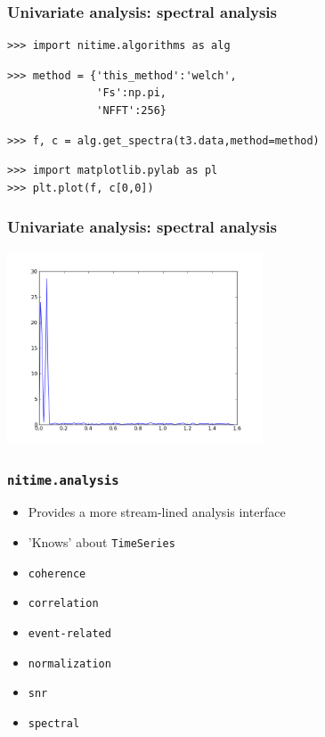 \documentclass{beamer}
\begin{document}
\begin{frame}[fragile]
\frametitle{Univariate analysis: spectral analysis }
\begin{lstlisting}
>>> import nitime.algorithms as alg
\end{lstlisting}
\pause
\begin{lstlisting}
>>> method = {'this_method':'welch',
              'Fs':np.pi,
              'NFFT':256}
\end{lstlisting}
\pause
\begin{lstlisting}
>>> f, c = alg.get_spectra(t3.data,method=method)
\end{lstlisting}
\pause
\begin{lstlisting}
>>> import matplotlib.pylab as pl 
>>> plt.plot(f, c[0,0])
\end{lstlisting}
\end{frame}

\begin{frame}
\frametitle{Univariate analysis: spectral analysis}
\includegraphics[height=5.7cm]{figures/outa_phase_tseries_single_psd}
\end{frame}

\begin{frame}
\frametitle{\tt{nitime.analysis}}
\begin{itemize}
\pause
\item 
Provides a more stream-lined analysis interface
\pause
\item 
'Knows' about \tt{TimeSeries} 
\pause
\item
\tt{coherence}
\pause
\item
\tt{correlation}
\pause
\item
\tt{event-related}
\pause
\item
\tt{normalization}
\pause
\item
\tt{snr}
\item
\pause
\tt{spectral}
\end{itemize}
\end{frame}
\end{document}
